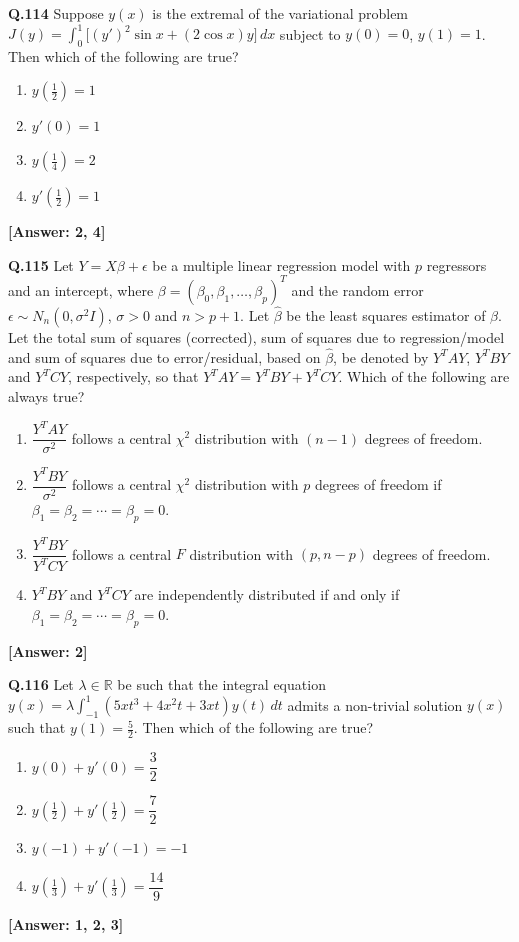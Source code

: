 \documentclass[12pt,a4paper]{article}
\newcommand{\ans}[1]{\quad\textcolor{anscolor}{\textbf{[Answer: #1]}}}
\begin{document}
\textbf{Q.114} Suppose $y(x)$ is the extremal of the variational problem $J(y)=\int_0^1\bigl[(y')^2\sin x+(2\cos x)y\bigr]\,dx$ subject to $y(0)=0$, $y(1)=1$. Then which of the following are true?
\begin{enumerate}[label=\arabic*.]
\item $y\!\left(\tfrac{1}{2}\right)=1$ \item $y'(0)=1$
\item $y\!\left(\tfrac{1}{4}\right)=2$ \item $y'\!\left(\tfrac{1}{2}\right)=1$
\end{enumerate}\ans{2, 4}

\textbf{Q.115} Let $Y=X\beta+\epsilon$ be a multiple linear regression model with $p$ regressors and an intercept, where $\beta=(\beta_0,\beta_1,\ldots,\beta_p)^T$ and the random error $\epsilon\sim N_n(0,\sigma^2I)$, $\sigma>0$ and $n>p+1$. Let $\hat{\beta}$ be the least squares estimator of $\beta$. Let the total sum of squares (corrected), sum of squares due to regression/model and sum of squares due to error/residual, based on $\hat{\beta}$, be denoted by $Y^TAY$, $Y^TBY$ and $Y^TCY$, respectively, so that $Y^TAY=Y^TBY+Y^TCY$. Which of the following are always true?
\begin{enumerate}[label=\arabic*.]
\item $\dfrac{Y^TAY}{\sigma^2}$ follows a central $\chi^2$ distribution with $(n-1)$ degrees of freedom.
\item $\dfrac{Y^TBY}{\sigma^2}$ follows a central $\chi^2$ distribution with $p$ degrees of freedom if $\beta_1=\beta_2=\cdots=\beta_p=0$.
\item $\dfrac{Y^TBY}{Y^TCY}$ follows a central $F$ distribution with $(p,n-p)$ degrees of freedom.
\item $Y^TBY$ and $Y^TCY$ are independently distributed if and only if $\beta_1=\beta_2=\cdots=\beta_p=0$.
\end{enumerate}\ans{2}

\textbf{Q.116} Let $\lambda\in\mathbb{R}$ be such that the integral equation $y(x)=\lambda\int_{-1}^1(5xt^3+4x^2t+3xt)y(t)\,dt$ admits a non-trivial solution $y(x)$ such that $y(1)=\tfrac{5}{2}$. Then which of the following are true?
\begin{enumerate}[label=\arabic*.]
\item $y(0)+y'(0)=\dfrac{3}{2}$
\item $y\!\left(\tfrac{1}{2}\right)+y'\!\left(\tfrac{1}{2}\right)=\dfrac{7}{2}$
\item $y(-1)+y'(-1)=-1$
\item $y\!\left(\tfrac{1}{3}\right)+y'\!\left(\tfrac{1}{3}\right)=\dfrac{14}{9}$
\end{enumerate}\ans{1, 2, 3}
\end{document}
